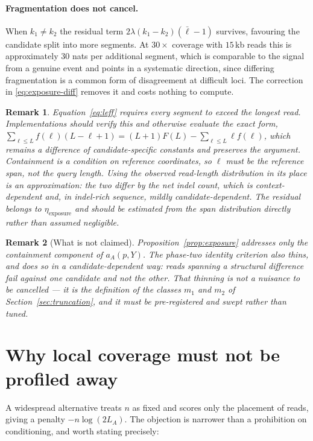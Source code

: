 \documentclass[11pt]{article}
\newtheorem{remark}{Remark}
\begin{document}
\paragraph{Fragmentation does not cancel.}  When $k_1 \neq k_2$ the residual
term $2\lambda(k_1-k_2)(\bar\ell-1)$ survives, favouring the candidate split
into more segments.  At $30\times$ coverage with $15$\,kb reads this is
approximately $30$ nats per additional segment, which is comparable to the
signal from a genuine event and points in a systematic direction, since
differing fragmentation is a common form of disagreement at difficult loci.
The correction in \eqref{eq:exposure-diff} removes it and costs nothing to
compute.

\begin{remark}
Equation~\eqref{eq:leff} requires every segment to exceed the longest read.
Implementations should verify this and otherwise evaluate the exact form,
$\sum_{\ell\le L}f(\ell)(L-\ell+1) = (L+1)F(L) - \sum_{\ell\le L}\ell f(\ell)$,
which remains a difference of candidate-specific constants and preserves the
argument.  Containment is a condition on reference coordinates, so $\ell$ must be the
\emph{reference span}, not the query length.  Using the observed read-length
distribution in its place is an approximation: the two differ by the net indel
count, which is context-dependent and, in indel-rich sequence, mildly
candidate-dependent.  The residual belongs to $\eta_{\text{exposure}}$ and
should be estimated from the span distribution directly rather than assumed
negligible.
\end{remark}

\begin{remark}[What is not claimed]
Proposition~\ref{prop:exposure} addresses only the containment component of
$a_A(p,Y)$.  The phase-two identity criterion also thins, and does so in a
candidate-dependent way: reads spanning a structural difference fail against one
candidate and not the other.  That thinning is not a nuisance to be cancelled
--- it is the definition of the classes $m_1$ and $m_2$ of
Section~\ref{sec:truncation}, and it must be pre-registered and swept rather
than tuned.
\end{remark}

\section{Why local coverage must not be profiled away}
\label{sec:conditioning}

A widespread alternative treats $n$ as fixed and scores only the placement of
reads, giving a penalty $-n\log(2L_A)$.  The objection is narrower than a
prohibition on conditioning, and worth stating precisely:
\end{document}
